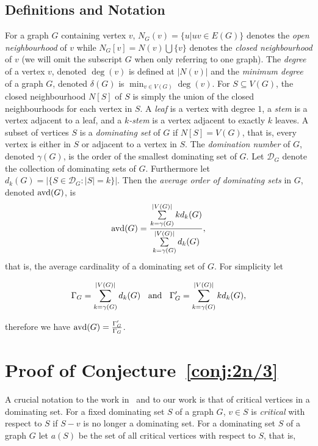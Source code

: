 \documentclass[11pt]{article}
\newcommand{\avd}{\text{\rm{avd}}}
\begin{document}
\subsection{Definitions and Notation}\label{subsec:defs}
For a graph $G$ containing vertex $v$, $N_G(v) = \{u|uv \in E(G)\}$ denotes the \emph{open neighbourhood} of $v$ while $N_G[v] = N(v) \bigcup \{v\}$ denotes the \emph{closed neighbourhood} of $v$ (we will omit the subscript $G$ when only referring to one graph). The \textit{degree} of a vertex $v$, denoted $\deg(v)$ is defined at $|N(v)|$ and the \textit{minimum degree} of a graph $G$, denoted $\delta(G)$ is $\min_{v\in V(G)}\deg(v)$.  For $S \subseteq V(G)$, the closed neighbourhood $N[S]$ of $S$ is simply the union of the closed neighbourhoods for each vertex in $S$. A \textit{leaf} is a vertex with degree $1$, a \textit{stem} is a vertex adjacent to a leaf, and a \textit{$k$-stem} is a vertex adjacent to exactly $k$ leaves. A subset of vertices $S$ is a \emph{dominating set} of $G$ if $N[S] = V(G)$, that is, every vertex is either in $S$ or adjacent to a vertex in $S$. The \emph{domination number} of $G$, denoted $\gamma(G)$, is the order of the smallest dominating set of $G$.%
Let $\mathcal{D}_G$ denote the collection of dominating sets of $G$. Furthermore let $d_k(G) = |\{S \in \mathcal{D}_G: |S|=k\}|$. Then the \emph{average order of dominating sets} in $G$, denoted $\avd(G)$, is
$$\avd(G)= \frac{\sum\limits_{k=\gamma(G)}^{|V(G)|} kd_k(G)}{\sum\limits_{k=\gamma(G)}^{|V(G)|} d_k(G)},$$
that is, the average cardinality of a dominating set of $G$. For simplicity let 

 $$\Gamma_G= \sum\limits_{k=\gamma(G)}^{|V(G)|} d_k(G)\hspace{2mm} \text{ and } \hspace{2mm} \Gamma'_G=\sum\limits_{k=\gamma(G)}^{|V(G)|} kd_k(G),$$

\noindent therefore we have $\avd(G)=\frac{\Gamma'_G}{\Gamma_G}$.


\section{Proof of Conjecture~\ref{conj:2n/3}}\label{sec:avdnorm}
A crucial notation to the work in~\cite{2021Beaton} and to our work is that of critical vertices in a dominating set. For a fixed dominating set $S$ of a graph $G$, $v\in S$ is \emph{critical} with respect to $S$ if $S-v$ is no longer a dominating set. For a dominating set $S$ of a graph $G$ let $a(S)$ be the set of all critical vertices with respect to $S$, that is,
\end{document}
